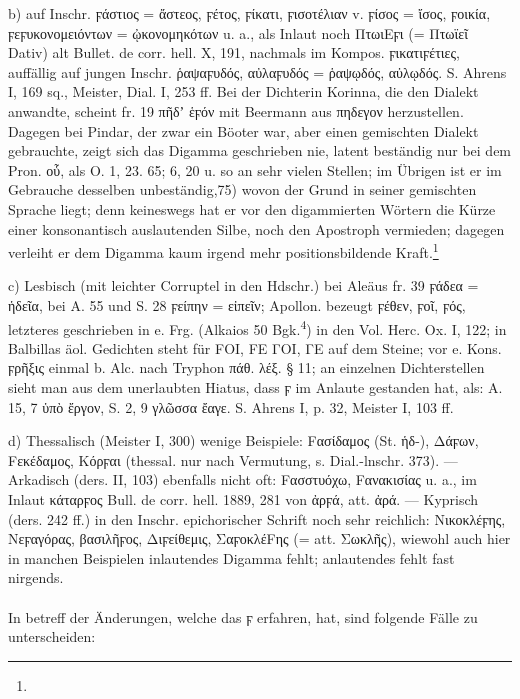 b)  auf Inschr. ϝάστιος = ἄστεος, ϝέτος, ϝίκατι, ϝισοτέλιαν v. ϝίσος =
ἴσος, ϝοικία, ϝεϝυκονομειόντων = ᾠκονομηκότων u. a., als Inlaut noch ΠτωιΕϝι (=
Πτωϊεῖ Dativ) alt Bullet. de corr. hell. X, 191, nachmals im Kompos.
ϝικατιϝέτιες, auffällig auf jungen Inschr. ῥαψαϝυδός, αὐλαϝυδός = ῥαψῳδός,
αὐλῳδός. S. Ahrens I, 169 sq., Meister, Dial. I, 253 ff. Bei der Dichterin
Korinna, die den  Dialekt anwandte, scheint fr. 19 πῆδʼ ἑϝόν mit Beermann
aus πηδεγον herzustellen. Dagegen bei Pindar, der zwar ein Böoter war, aber
einen gemischten Dialekt gebrauchte, zeigt sich das Digamma geschrieben nie,
latent beständig nur bei dem Pron. οὗ, als O. 1, 23. 65; 6, 20 u. so an sehr
vielen Stellen; im Übrigen ist er im Gebrauche desselben unbeständig,75) wovon
der Grund in seiner gemischten Sprache liegt; denn keineswegs hat er vor den
digammierten Wörtern die Kürze einer konsonantisch auslautenden Silbe, noch den
Apostroph vermieden; dagegen verleiht er dem Digamma kaum irgend mehr
positionsbildende Kraft.\footnote{}

c) Lesbisch (mit leichter Corruptel in den Hdschr.) bei Aleäus fr. 39 ϝάδεα =
ἡδεῖα, bei A. 55 und S. 28 ϝείπην = εἰπεῖν; Apollon. bezeugt ϝέθεν, ϝοῖ, ϝός,
letzteres geschrieben in e. Frg. (Alkaios 50 Bgk.\textsuperscript{4}) in den
Vol. Herc. Ox. I, 122; in Balbillas äol. Gedichten steht für FΟΙ, FΕ ΓΟΙ, ΓΕ auf
dem Steine; vor e. Kons. ϝρῆξις einmal b. Alc. nach Tryphon πάθ. λέξ. § 11; an
einzelnen Dichterstellen sieht man aus dem unerlaubten Hiatus, dass ϝ im Anlaute
gestanden hat, als: A. 15, 7 ὑπὸ ἔργον, S. 2, 9 γλῶσσα ἔαγε. S. Ahrens I, p. 32,
Meister I, 103 ff. 

d) Thessalisch (Meister I, 300) wenige Beispiele: Fασίδαμος (St. ἡδ-), Δάϝων,
Fεκέδαμος, Κόρϝαι (thessal. nur nach Vermutung, s. Dial.-lnschr. 373). —
Arkadisch (ders. II, 103) ebenfalls nicht oft: Fασστυόχω, Fανακισίας u. a., im
Inlaut κάταρϝος Bull. de corr. hell. 1889, 281 von ἀρϝά, att. ἀρά. — Kyprisch
(ders. 242 ff.) in den Inschr. epichorischer Schrift noch sehr reichlich:
Νικοκλέϝης, Νεϝαγόρας, βασιλῆϝος, Διϝείθεμις, ΣαϝοκλέFης (= att. Σωκλῆς),
wiewohl auch hier in manchen Beispielen inlautendes Digamma fehlt; anlautendes
fehlt fast nirgends.

\paragraph{} In betreff der Änderungen, welche das ϝ erfahren, hat, sind folgende Fälle zu unterscheiden:

